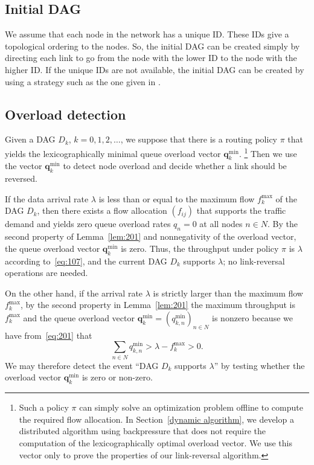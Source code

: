 \documentclass{sig-alternate-2013}
\begin{document}
\subsection{Initial DAG}  \label{sec: initial dag}
We assume that each node in the network has a unique ID. These IDs give a topological ordering to the nodes. So, the initial DAG can be created simply by directing each link to go from the node with the lower ID to the node with the higher ID. If the unique IDs are not available, the initial DAG can be created by using a strategy such as the one given in \cite{tora}.



\subsection{Overload detection}

Given a DAG $D_{k}$, $k=0, 1, 2, \ldots$, we suppose that there is a routing policy $\pi$ that yields the lexicographically minimal queue overload vector $\bm{q}^{\text{min}}_{k}$. \footnote{Such a policy $\pi$ can simply solve an optimization problem offline to compute the required flow allocation. In Section~\ref{dynamic algorithm}, we develop a distributed algorithm using backpressure that does not require the computation of the lexicographically optimal overload vector. We use this vector only to prove the properties of our link-reversal algorithm.} 
Then we use the vector $\bm{q}^{\text{min}}_{k}$
to detect node overload and decide whether a link should be reversed.

If the data arrival rate $\lambda$ is less than or equal to the maximum flow $f^{\max}_{k}$ of the DAG $D_{k}$, then there exists a flow allocation $(f_{ij})$ that supports the traffic demand and yields zero queue overload rates $q_{n}=0$ at all nodes $n\in N$. By  the second property of Lemma~\ref{lem:201} and nonnegativity of the overload vector,
the queue overload vector $\bm{q}^{\text{min}}_{k}$ is zero.
 Thus, the throughput under policy $\pi$ is  $\lambda$  according to~\eqref{eq:107}, and the current DAG $D_{k}$  supports $\lambda$; no link-reversal operations are needed. 

On the other hand, if the arrival rate $\lambda$ is strictly larger than the maximum flow $f^{\max}_{k}$, 
by the second property in Lemma~\ref{lem:201}  
the maximum throughput is $f^{\max}_{k}$ and
the queue overload vector $\bm{q}^{\min}_{k} = (q_{k,n}^{\text{min}})_{n\in N}$ is nonzero because we have  from~\eqref{eq:201} that
\[
\sum_{n\in N} q_{k,n}^{\text{min}} > \lambda - f^{\max}_{k} > 0.
\]
We may therefore detect the event ``DAG $D_k$  supports $\lambda$'' by testing whether  the overload vector 
$\bm{q}^{\min}_{k}$ is zero or  non-zero.
\end{document}

